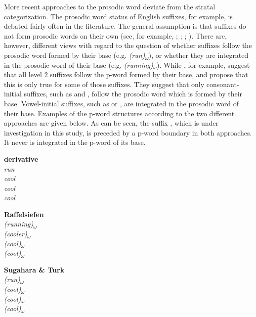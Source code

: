 More recent approaches to the prosodic word deviate from the stratal categorization. The prosodic word status of English suffixes, for example, is debated fairly often in the literature. The general assumption is that suffixes do not form prosodic words on their own (see, for example, \citealt[311]{Wennerstrom.1993}; \citealt[184]{Raffelsiefen.1999}; \citealt[401]{Hall.2001b}; \citealt{Sugahara.2009}). There are, however, different views with regard to the question of whether suffixes follow the prosodic word formed by their base (e.g. \textit{(run)\textsubscript{$\omega$}}), or whether they are integrated in the prosodic word of their base (e.g. \textit{(running)\textsubscript{$\omega$}}). While \cite{Sugahara.2009}, for example, suggest that all level 2 suffixes follow the p-word formed by their base, \cite{Raffelsiefen.1999} and \cite{Hall.2001b} propose that this is only true for some of those suffixes. They suggest that only consonant-initial suffixes, such as  and , follow the prosodic word which is formed by their base. Vowel-initial suffixes, such as  or , are integrated in the prosodic word of their base. Examples of the p-word structures according to the two different approaches are given below. As can be seen, the suffix , which is under investigation in this study, is preceded by a p-word boundary in both approaches. It never is integrated in the p-word of its base.


\begin{multicols}{3}

	\begin{exe}
	
	\ex		
		\textbf{derivative}	\\
		\textit{run}	\\
		\textit{cool} 	\\
		 \textit{cool}\\
		\textit{cool} \\			
		\columnbreak 
		
		\textbf{Raffelsiefen }	\\
		\textit{(running)\textsubscript{$\omega$}} 	\\
		\textit{(cooler)\textsubscript{$\omega$}} \\
		\textit{(cool)\textsubscript{$\omega$}} \\
		\textit{(cool)\textsubscript{$\omega$}} \\
		\columnbreak
			
		\textbf{Sugahara \& Turk}	\\
		\textit{(run)\textsubscript{$\omega$}} \\
		\textit{(cool)\textsubscript{$\omega$}} 	\\	
		\textit{(cool)\textsubscript{$\omega$}}\\
		\textit{(cool)\textsubscript{$\omega$}}	\\

	\end{exe}
	
\end{multicols}

